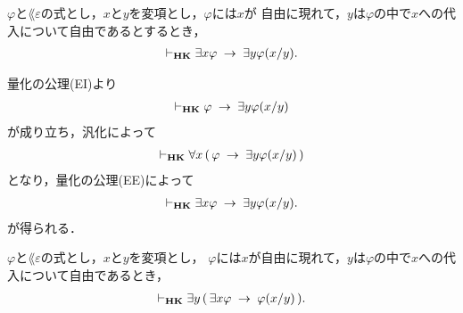 	\begin{screen}
		\begin{thm}
			$\varphi$と$\lang{\varepsilon}$の式とし，$x$と$y$を変項とし，$\varphi$には$x$が
			自由に現れて，$y$は$\varphi$の中で$x$への代入について自由であるとするとき，
			\begin{align}
				\vdash_{{\scriptsize \mbox{{\bf HK}}}} \exists x \varphi \hspace{0.25em}\rightarrow\hspace{0.25em} \exists y \varphi(x/y).
			\end{align}
		\end{thm}
	\end{screen}
	
	\begin{sketch}
		量化の公理(EI)より
		\begin{align}
			\vdash_{{\scriptsize \mbox{{\bf HK}}}} \varphi \hspace{0.25em}\rightarrow\hspace{0.25em} \exists y \varphi(x/y)
		\end{align}
		が成り立ち，汎化によって
		\begin{align}
			\vdash_{{\scriptsize \mbox{{\bf HK}}}} \forall x\, (\, \varphi \hspace{0.25em}\rightarrow\hspace{0.25em} \exists y \varphi(x/y)\, )
		\end{align}
		となり，量化の公理(EE)によって
		\begin{align}
			\vdash_{{\scriptsize \mbox{{\bf HK}}}} \exists x \varphi \hspace{0.25em}\rightarrow\hspace{0.25em} \exists y \varphi(x/y).
		\end{align}
		が得られる．
		\QED
	\end{sketch}
	
	\begin{screen}
		\begin{thm}\label{classic:lemma_for_Henkin_expansion}
			$\varphi$と$\lang{\varepsilon}$の式とし，$x$と$y$を変項とし，
			$\varphi$には$x$が自由に現れて，$y$は$\varphi$の中で$x$への代入について自由であるとき，
			\begin{align}
				\vdash_{{\scriptsize \mbox{{\bf HK}}}} \exists y\, (\, \exists x \varphi \hspace{0.25em}\rightarrow\hspace{0.25em} \varphi(x/y)\, ).
			\end{align}
		\end{thm}
	\end{screen}
	
